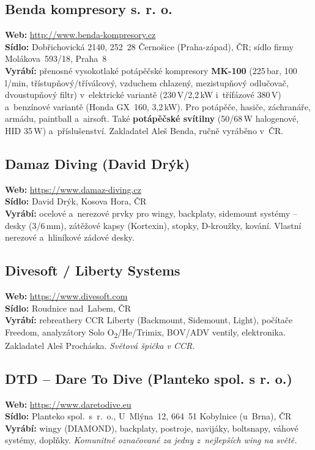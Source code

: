 \documentclass[11pt,a4paper]{article}
\begin{document}
\subsection{Benda kompresory s. r. o.}
\textbf{Web:} \url{http://www.benda-kompresory.cz} \\
\textbf{Sídlo:} Dobřichovická 2140, 252~28 Černošice (Praha-západ), ČR; sídlo firmy Molákova~593/18, Praha~8 \\
\textbf{Vyrábí:} přenosné vysokotlaké potápěčské kompresory \textbf{MK-100} (225\,bar, 100\,l/min, třístupňový/tříválcový, vzduchem chlazený, mezistupňový odlučovač, dvoustupňový filtr) v~elektrické variantě (230\,V/2,2\,kW i~třífázové 380\,V) a~benzínové variantě (Honda GX~160, 3,2\,kW). Pro potápěče, hasiče, záchranáře, armádu, paintball a~airsoft. Také \textbf{potápěčské svítilny} (50/68\,W halogenové, HID 35\,W) a~příslušenství. Zakladatel Aleš Benda, ručně vyráběno v~ČR.

\subsection{Damaz Diving (David Drýk)}
\textbf{Web:} \url{https://www.damaz-diving.cz} \\
\textbf{Sídlo:} David Drýk, Kosova Hora, ČR \\
\textbf{Vyrábí:} ocelové a~nerezové prvky pro wingy, backplaty, sidemount systémy -- desky (3/6\,mm), zátěžové kapsy (Kortexin), stopky, D-kroužky, kování. Vlastní nerezové a~hliníkové zádové desky.

\subsection{Divesoft / Liberty Systems}
\textbf{Web:} \url{https://www.divesoft.com} \\
\textbf{Sídlo:} Roudnice nad~Labem, ČR \\
\textbf{Vyrábí:} rebreathery CCR Liberty (Backmount, Sidemount, Light), počítače Freedom, analyzátory Solo O\textsubscript{2}/He/Trimix, BOV/ADV ventily, elektronika. Zakladatel Aleš Procháska. \emph{Světová špička v CCR.}

\subsection{DTD -- Dare To Dive (Planteko spol. s r. o.)}
\textbf{Web:} \url{https://www.daretodive.eu} \\
\textbf{Sídlo:} Planteko spol.~s~r.~o., U~Mlýna~12, 664~51 Kobylnice (u~Brna), ČR \\
\textbf{Vyrábí:} wingy (DIAMOND), backplaty, postroje, navijáky, boltsnapy, váhové systémy, doplňky. \emph{Komunitně označované za jedny z~nejlepších wing na světě.}
\end{document}
